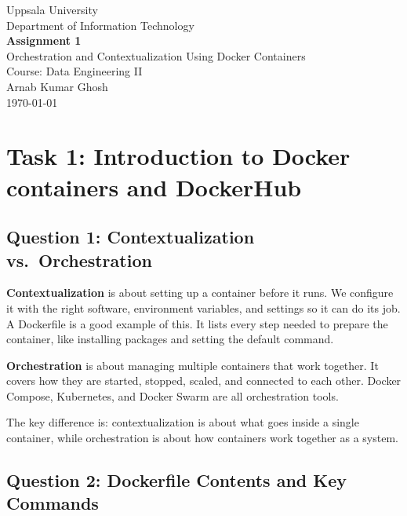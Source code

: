 \documentclass[11pt,a4paper]{article}
\begin{document}
\begin{titlepage}
  \centering
  \vspace*{2cm}
  {\large Uppsala University\\[0.3em]
   Department of Information Technology\\[2cm]}
  {\LARGE\bfseries Assignment 1\\[0.5em]}
  {\Large Orchestration and Contextualization Using Docker Containers\\[2cm]}
  {\large Course: Data Engineering II\\[1.5cm]}
  {\normalsize Arnab Kumar Ghosh\\[0.5cm]}
  {\normalsize \today\\[3cm]}
  \vfill
\end{titlepage}

\tableofcontents
\newpage

\section{Task 1: Introduction to Docker containers and DockerHub}

\subsection{Question 1: Contextualization vs.\ Orchestration}

\textbf{Contextualization} is about setting up a container before it runs.
We configure it with the right software, environment variables, and settings
so it can do its job. A Dockerfile is a good example of this. It lists every
step needed to prepare the container, like installing packages and setting
the default command.

\textbf{Orchestration} is about managing multiple containers that work together.
It covers how they are started, stopped, scaled, and connected to each other.
Docker Compose, Kubernetes, and Docker Swarm are all orchestration tools.

The key difference is: contextualization is about what goes inside a single
container, while orchestration is about how containers work together as
a system.

\subsection{Question 2: Dockerfile Contents and Key Commands}
\end{document}

